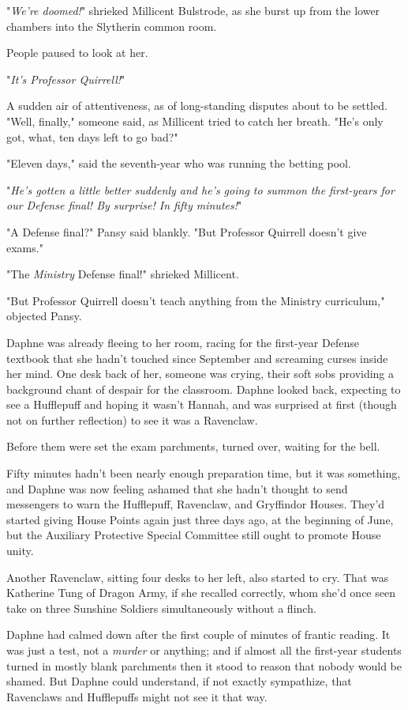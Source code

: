 "\emph{We're doomed!}" shrieked Millicent Bulstrode, as she burst up from the lower chambers into the Slytherin common room.

People paused to look at her.

"\emph{It's Professor Quirrell!}"

A sudden air of attentiveness, as of long-standing disputes about to be settled. "Well, finally," someone said, as Millicent tried to catch her breath. "He's only got, what, ten days left to go bad?"

"Eleven days," said the seventh-year who was running the betting pool.

"\emph{He's gotten a little better suddenly and he's going to summon the first-years for our Defense final! By surprise! In fifty minutes!}"

"A Defense final?" Pansy said blankly. "But Professor Quirrell doesn't give exams."

"The \emph{Ministry} Defense final!" shrieked Millicent.

"But Professor Quirrell doesn't teach anything from the Ministry curriculum," objected Pansy.

Daphne was already fleeing to her room, racing for the first-year Defense textbook that she hadn't touched since September and screaming curses inside her mind.
\sbreak
One desk back of her, someone was crying, their soft sobs providing a background chant of despair for the classroom. Daphne looked back, expecting to see a Hufflepuff and hoping it wasn't Hannah, and was surprised at first (though not on further reflection) to see it was a Ravenclaw.

Before them were set the exam parchments, turned over, waiting for the bell.

Fifty minutes hadn't been nearly enough preparation time, but it was something, and Daphne was now feeling ashamed that she hadn't thought to send messengers to warn the Hufflepuff, Ravenclaw, and Gryffindor Houses. They'd started giving House Points again just three days ago, at the beginning of June, but the Auxiliary Protective Special Committee still ought to promote House unity.

Another Ravenclaw, sitting four desks to her left, also started to cry. That was Katherine Tung of Dragon Army, if she recalled correctly, whom she'd once seen take on three Sunshine Soldiers simultaneously without a flinch.

Daphne had calmed down after the first couple of minutes of frantic reading. It was just a test, not a \emph{murder} or anything; and if almost all the first-year students turned in mostly blank parchments then it stood to reason that nobody would be shamed. But Daphne could understand, if not exactly sympathize, that Ravenclaws and Hufflepuffs might not see it that way.

